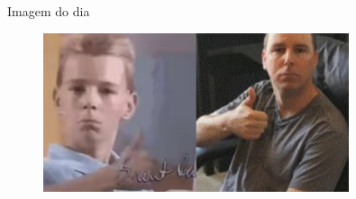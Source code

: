 \documentclass{beamer}
\begin{document}
\begin{frame}[fragile]{Imagem do dia}

        \begin{figure}[H]
            \centerline{\includegraphics[width=0.8\textwidth]{assets/imagem-do-dia/brent_rambo.jpg}}
            
        \end{figure}
\end{frame}


\footlinecolor{}

\backmatter
\end{document}
